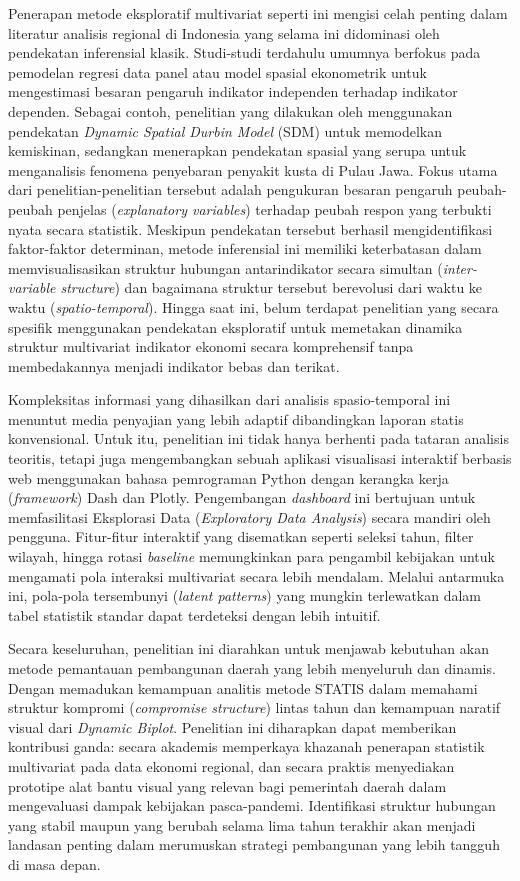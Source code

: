 Penerapan metode eksploratif multivariat seperti ini mengisi celah penting dalam literatur analisis regional di Indonesia yang selama ini didominasi oleh pendekatan inferensial klasik. Studi-studi terdahulu umumnya berfokus pada pemodelan regresi data panel atau model spasial ekonometrik untuk mengestimasi besaran pengaruh indikator independen terhadap indikator dependen. Sebagai contoh, penelitian yang dilakukan oleh \citet{nuswantari2021} menggunakan pendekatan \textit{Dynamic Spatial Durbin Model} (SDM) untuk memodelkan kemiskinan, sedangkan \citet{ahmad2024} menerapkan pendekatan spasial yang serupa untuk menganalisis fenomena penyebaran penyakit kusta di Pulau Jawa. Fokus utama dari penelitian-penelitian tersebut adalah pengukuran besaran pengaruh peubah-peubah penjelas (\textit{explanatory variables}) terhadap peubah respon yang terbukti nyata secara statistik. Meskipun pendekatan tersebut berhasil mengidentifikasi faktor-faktor determinan, metode inferensial ini memiliki keterbatasan dalam memvisualisasikan struktur hubungan antarindikator secara simultan (\textit{inter-variable structure}) dan bagaimana struktur tersebut berevolusi dari waktu ke waktu (\textit{spatio-temporal}). Hingga saat ini, belum terdapat penelitian yang secara spesifik menggunakan pendekatan eksploratif untuk memetakan dinamika struktur multivariat indikator ekonomi secara komprehensif tanpa membedakannya menjadi indikator bebas dan terikat.

Kompleksitas informasi yang dihasilkan dari analisis spasio-temporal ini menuntut media penyajian yang lebih adaptif dibandingkan laporan statis konvensional. Untuk itu, penelitian ini tidak hanya berhenti pada tataran analisis teoritis, tetapi juga mengembangkan sebuah aplikasi visualisasi interaktif berbasis web menggunakan bahasa pemrograman Python dengan kerangka kerja (\textit{framework}) Dash dan Plotly. Pengembangan \textit{dashboard} ini bertujuan untuk memfasilitasi Eksplorasi Data (\textit{Exploratory Data Analysis}) secara mandiri oleh pengguna. Fitur-fitur interaktif yang disematkan seperti seleksi tahun, filter wilayah, hingga rotasi \textit{baseline} memungkinkan para pengambil kebijakan untuk mengamati pola interaksi multivariat secara lebih mendalam. Melalui antarmuka ini, pola-pola tersembunyi (\textit{latent patterns}) yang mungkin terlewatkan dalam tabel statistik standar dapat terdeteksi dengan lebih intuitif.

Secara keseluruhan, penelitian ini diarahkan untuk menjawab kebutuhan akan metode pemantauan pembangunan daerah yang lebih menyeluruh dan dinamis. Dengan memadukan kemampuan analitis metode STATIS dalam memahami struktur kompromi (\textit{compromise structure}) lintas tahun dan kemampuan naratif visual dari \textit{Dynamic Biplot}. Penelitian ini diharapkan dapat memberikan kontribusi ganda: secara akademis memperkaya khazanah penerapan statistik multivariat pada data ekonomi regional, dan secara praktis menyediakan prototipe alat bantu visual yang relevan bagi pemerintah daerah dalam mengevaluasi dampak kebijakan pasca-pandemi. Identifikasi struktur hubungan yang stabil maupun yang berubah selama lima tahun terakhir akan menjadi landasan penting dalam merumuskan strategi pembangunan yang lebih tangguh di masa depan.

